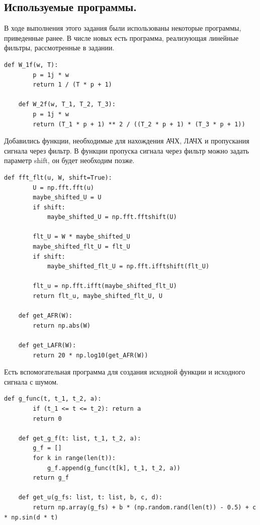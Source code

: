 \documentclass[a4paper, 12pt]{article}
\begin{document}
    \subsection{Используемые программы.}
    В ходе выполнения этого задания были использованы некоторые программы, приведенные ранее. В числе новых есть программа,
    реализующая линейные фильтры, рассмотренные в задании.
    \begin{lstlisting}[label=c2, caption={Программа, содержащая реализацию линейных фильтров.}]
    def W_1f(w, T):
        p = 1j * w
        return 1 / (T * p + 1)
    
    def W_2f(w, T_1, T_2, T_3):
        p = 1j * w
        return (T_1 * p + 1) ** 2 / ((T_2 * p + 1) * (T_3 * p + 1))
    \end{lstlisting}


    Добавились функции, необходимые для нахождения АЧХ, ЛАЧХ и пропускания сигнала через фильтр.
    В функции пропуска сигнала через фильтр можно задать параметр shift, он будет необходим позже.
    \begin{lstlisting}[label=c22, caption={Программа для нахождения АЧХ, ЛАЧХ и пропуска сигнала через фильтр.}]
    def fft_flt(u, W, shift=True):
        U = np.fft.fft(u)
        maybe_shifted_U = U
        if shift:
            maybe_shifted_U = np.fft.fftshift(U)
    
        flt_U = W * maybe_shifted_U
        maybe_shifted_flt_U = flt_U
        if shift:
            maybe_shifted_flt_U = np.fft.ifftshift(flt_U)
    
        flt_u = np.fft.ifft(maybe_shifted_flt_U)
        return flt_u, maybe_shifted_flt_U, U
    
    def get_AFR(W):
        return np.abs(W)
    
    def get_LAFR(W):
        return 20 * np.log10(get_AFR(W))
    \end{lstlisting}


    Есть вспомогательная программа для создания исходной функции и исходного сигнала с шумом.
    \begin{lstlisting}[label=help, caption={Программа для создания исходной функции и сигнала с шумом.}]
    def g_func(t, t_1, t_2, a):
        if (t_1 <= t <= t_2): return a
        return 0
    
    def get_g_f(t: list, t_1, t_2, a):
        g_f = []
        for k in range(len(t)):
            g_f.append(g_func(t[k], t_1, t_2, a))
        return g_f
    
    def get_u(g_fs: list, t: list, b, c, d):
        return np.array(g_fs) + b * (np.random.rand(len(t)) - 0.5) + c * np.sin(d * t)
    \end{lstlisting}
\end{document}
